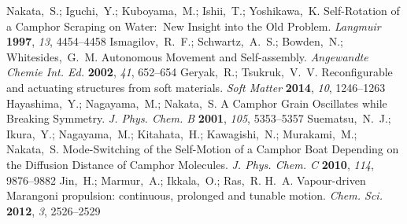 \documentclass[journal=langd5, manuscript=article, layout=twocolumn]{achemso}
\begin{document}
\begin{mcitethebibliography}{27}
\mciteBstWouldAddEndPuncttrue
\mciteSetBstMidEndSepPunct{\mcitedefaultmidpunct}
{\mcitedefaultendpunct}{\mcitedefaultseppunct}\relax
\EndOfBibitem
{}
Nakata,~S.; Iguchi,~Y.; Kuboyama,~M.; Ishii,~T.; Yoshikawa,~K. Self-Rotation of
  a Camphor Scraping on Water:  New Insight into the Old Problem.
  \emph{Langmuir} \textbf{1997}, \emph{13}, 4454--4458\relax
\mciteBstWouldAddEndPuncttrue
\mciteSetBstMidEndSepPunct{\mcitedefaultmidpunct}
{\mcitedefaultendpunct}{\mcitedefaultseppunct}\relax
\EndOfBibitem
{}
Ismagilov,~R.~F.; Schwartz,~A.~S.; Bowden,~N.; Whitesides,~G.~M. Autonomous
  Movement and Self-assembly. \emph{Angewandte Chemie Int. Ed.} \textbf{2002},
  \emph{41}, 652--654\relax
\mciteBstWouldAddEndPuncttrue
\mciteSetBstMidEndSepPunct{\mcitedefaultmidpunct}
{\mcitedefaultendpunct}{\mcitedefaultseppunct}\relax
\EndOfBibitem
{}
Geryak,~R.; Tsukruk,~V.~V. Reconfigurable and actuating structures from soft
  materials. \emph{Soft Matter} \textbf{2014}, \emph{10}, 1246--1263\relax
\mciteBstWouldAddEndPuncttrue
\mciteSetBstMidEndSepPunct{\mcitedefaultmidpunct}
{\mcitedefaultendpunct}{\mcitedefaultseppunct}\relax
\EndOfBibitem
{}
Hayashima,~Y.; Nagayama,~M.; Nakata,~S. A Camphor Grain Oscillates while
  Breaking Symmetry. \emph{J. Phys. Chem. B} \textbf{2001}, \emph{105},
  5353--5357\relax
\mciteBstWouldAddEndPuncttrue
\mciteSetBstMidEndSepPunct{\mcitedefaultmidpunct}
{\mcitedefaultendpunct}{\mcitedefaultseppunct}\relax
\EndOfBibitem
{}
Suematsu,~N.~J.; Ikura,~Y.; Nagayama,~M.; Kitahata,~H.; Kawagishi,~N.;
  Murakami,~M.; Nakata,~S. Mode-Switching of the Self-Motion of a Camphor Boat
  Depending on the Diffusion Distance of Camphor Molecules. \emph{J. Phys.
  Chem. C} \textbf{2010}, \emph{114}, 9876--9882\relax
\mciteBstWouldAddEndPuncttrue
\mciteSetBstMidEndSepPunct{\mcitedefaultmidpunct}
{\mcitedefaultendpunct}{\mcitedefaultseppunct}\relax
\EndOfBibitem
{}
Jin,~H.; Marmur,~A.; Ikkala,~O.; Ras,~R. H.~A. Vapour-driven Marangoni
  propulsion: continuous, prolonged and tunable motion. \emph{Chem. Sci.}
  \textbf{2012}, \emph{3}, 2526--2529\relax

\end{mcitethebibliography}
\end{document}

